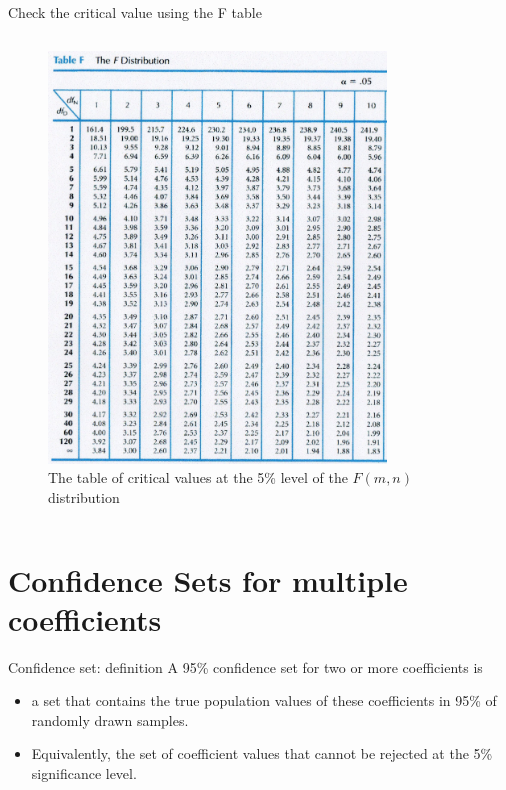 \documentclass[presentation,10pt]{beamer}
\begin{document}
\begin{frame}[label={sec:org6aafe07}]{Check the critical value using the F table}
\begin{columns}
\begin{column}{0.5\columnwidth}
\begin{figure}[htbp]
\centering
\includegraphics[width=0.8\textwidth]{img/Ftrunc.jpg}
\caption{The table of critical values at the 5\% level of the \(F(m, n)\) distribution}
\end{figure}
\end{column}
\end{columns}
\end{frame}

\section{Confidence Sets for multiple coefficients}
\label{sec:org6da0a6b}
\setcounter{tocdepth}{1}
\tableofcontents[currentsection]
\begin{frame}[label={sec:org3bbfe6a}]{Confidence set: definition}
A 95\% \alert{confidence set} for two or more coefficients is

\begin{itemize}
\item a set that contains the true population values of these coefficients
in 95\% of randomly drawn samples.

\item Equivalently, the set of coefficient values that cannot be rejected
at the 5\% significance level.
\end{itemize}
\end{frame}
\end{document}
